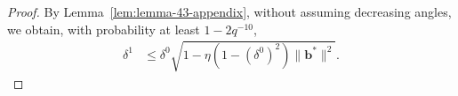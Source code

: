 \documentclass{article}
\theoremstyle{plain}
\theoremstyle{definition}
\theoremstyle{remark}
\begin{document}
\begin{proof}
By Lemma~\ref{lem:lemma-43-appendix}, without assuming decreasing angles, we obtain, with probability at least $1-2q^{-10}$, 
\begin{align}
    \delta^{1} &\leq \delta^{0} \sqrt{1-\eta (1-(\delta^{0})^2)\lVert \mathbf{b}^*\rVert^2} .
\end{align}


\end{proof}
\end{document}
